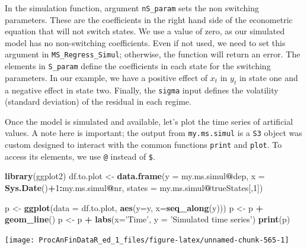\documentclass[11pt,]{book}
\newenvironment{Shaded}{\begin{snugshade}}{\end{snugshade}}
\newcommand{\KeywordTok}[1]{\textcolor[rgb]{0.27,0.27,0.27}{\textbf{#1}}}
\newcommand{\DataTypeTok}[1]{\textcolor[rgb]{0.27,0.27,0.27}{#1}}
\newcommand{\DecValTok}[1]{\textcolor[rgb]{0.06,0.06,0.06}{#1}}
\newcommand{\StringTok}[1]{\textcolor[rgb]{0.5,0.5,0.5}{#1}}
\newcommand{\OperatorTok}[1]{\textcolor[rgb]{0.81,0.36,0.00}{\textbf{#1}}}
\newcommand{\NormalTok}[1]{#1}
\begin{document}
In the simulation function, argument \texttt{nS\_param} sets the non
switching parameters. These are the coefficients in the right hand side
of the econometric equation that will not switch states. We use a value
of zero, as our simulated model has no non-switching coefficients. Even
if not used, we need to set this argument in
\texttt{MS\_Regress\_Simul}; otherwise, the function will return an
error. The elements in \texttt{S\_param} define the coefficients in each
state for the switching parameters. In our example, we have a positive
effect of \(x_t\) in \(y_t\) in state one and a negative effect in state
two. Finally, the \texttt{sigma} input defines the volatility (standard
deviation) of the residual in each regime.

Once the model is simulated and available, let's plot the time series of
artificial values. A note here is important; the output from
\texttt{my.ms.simul} is a \texttt{S3} object was custom designed to
interact with the common functions \texttt{print} and \texttt{plot}. To
access its elements, we use \texttt{@} instead of \texttt{\$}.

\begin{Shaded}
\begin{Highlighting}[]
\KeywordTok{library}\NormalTok{(ggplot2)}
\NormalTok{df.to.plot <-}\StringTok{ }\KeywordTok{data.frame}\NormalTok{(}\DataTypeTok{y =}\NormalTok{ my.ms.simul}\OperatorTok{@}\NormalTok{dep, }
                         \DataTypeTok{x =} \KeywordTok{Sys.Date}\NormalTok{()}\OperatorTok{+}\DecValTok{1}\OperatorTok{:}\NormalTok{my.ms.simul}\OperatorTok{@}\NormalTok{nr,}
                         \DataTypeTok{states =}\NormalTok{ my.ms.simul}\OperatorTok{@}\NormalTok{trueStates[,}\DecValTok{1}\NormalTok{])}

\NormalTok{p <-}\StringTok{ }\KeywordTok{ggplot}\NormalTok{(}\DataTypeTok{data =}\NormalTok{ df.to.plot, }\KeywordTok{aes}\NormalTok{(}\DataTypeTok{y=}\NormalTok{y, }\DataTypeTok{x=}\KeywordTok{seq_along}\NormalTok{(y)))}
\NormalTok{p <-}\StringTok{ }\NormalTok{p }\OperatorTok{+}\StringTok{ }\KeywordTok{geom_line}\NormalTok{()}
\NormalTok{p <-}\StringTok{ }\NormalTok{p }\OperatorTok{+}\StringTok{ }\KeywordTok{labs}\NormalTok{(}\DataTypeTok{x=}\StringTok{'Time'}\NormalTok{, }\DataTypeTok{y =} \StringTok{'Simulated time series'}\NormalTok{)}
\KeywordTok{print}\NormalTok{(p)}
\end{Highlighting}
\end{Shaded}

\begin{center}\texttt{[image: ProcAnFinDataR\_ed\_1\_files/figure-latex/unnamed-chunk-565-1]} \end{center}
\end{document}
